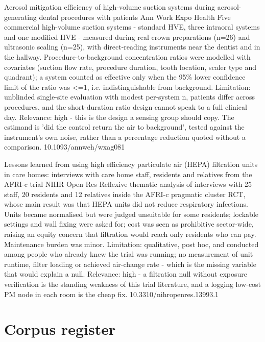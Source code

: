 \documentclass[10pt]{article}
\begin{document}
{Aerosol mitigation efficiency of high-volume suction systems during aerosol-generating dental procedures with patients}
{Ann Work Expo Health}
{Five commercial high-volume suction systems - standard HVE, three intraoral systems and one modified HVE - measured during real crown preparations (n=26) and ultrasonic scaling (n=25), with direct-reading instruments near the dentist and in the hallway. Procedure-to-background concentration ratios were modelled with covariates (suction flow rate, procedure duration, tooth location, scaler type and quadrant); a system counted as effective only when the 95\% lower confidence limit of the ratio was <=1, i.e. indistinguishable from background. Limitation: unblinded single-site evaluation with modest per-system n, patients differ across procedures, and the short-duration ratio design cannot speak to a full clinical day. Relevance: high - this is the design a sensing group should copy. The estimand is 'did the control return the air to background', tested against the instrument's own noise, rather than a percentage reduction quoted without a comparison.}
{10.1093/annweh/wxag081}

{Lessons learned from using high efficiency particulate air (HEPA) filtration units in care homes: interviews with care home staff, residents and relatives from the AFRI-c trial}
{NIHR Open Res}
{Reflexive thematic analysis of interviews with 25 staff, 20 residents and 12 relatives inside the AFRI-c pragmatic cluster RCT, whose main result was that HEPA units did not reduce respiratory infections. Units became normalised but were judged unsuitable for some residents; lockable settings and wall fixing were asked for; cost was seen as prohibitive sector-wide, raising an equity concern that filtration would reach only residents who can pay. Maintenance burden was minor. Limitation: qualitative, post hoc, and conducted among people who already knew the trial was running; no measurement of unit runtime, filter loading or achieved air-change rate - which is the missing variable that would explain a null. Relevance: high - a filtration null without exposure verification is the standing weakness of this trial literature, and a logging low-cost PM node in each room is the cheap fix.}
{10.3310/nihropenres.13993.1}

\clearpage
\section*{\sffamily\bfseries\color{Deep}Corpus register}
\vspace{-1.5mm}{\color{Amber}\rule{\linewidth}{1.1pt}}\vspace{2.5mm}
\end{document}

